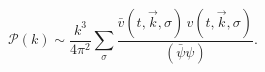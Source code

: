 \begin{equation}
  \mathcal{P}(k)\sim
   \frac{k^3}{4 \pi^2}\sum_\sigma
  \frac{\bar{v}(t,\vec{k},\sigma)\,v(t,\vec{k},\sigma)}
    {(\bar{\psi}\psi)}.
\end{equation}

